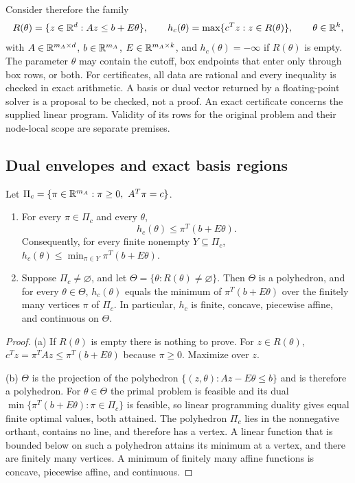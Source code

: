 Consider therefore the family
\begin{equation}\label{eq:param-lp-con}
 R(\theta)=\{z\in\mathbb{R}^d:Az\le b+E\theta\},\qquad
 h_c(\theta)=\max\{c^Tz:z\in R(\theta)\},\qquad \theta\in\mathbb{R}^k,
\end{equation}
with $A\in\mathbb{R}^{m_A\times d}$, $b\in\mathbb{R}^{m_A}$, $E\in\mathbb{R}^{m_A\times k}$, and
$h_c(\theta)=-\infty$ if $R(\theta)$ is empty. The parameter $\theta$ may
contain the cutoff, box endpoints that enter only through box rows, or
both. For certificates, all data are rational and every inequality is
checked in exact arithmetic. A basis or dual vector returned by a
floating-point solver is a proposal to be checked, not a proof. An exact
certificate concerns the supplied linear program. Validity of its rows
for the original problem and their node-local scope are separate premises.

\subsection{Dual envelopes and exact basis regions}\label{sec:dual-regions-con}

\begin{proposition}\label{prop:dual-envelope-con}
Let $\Pi_c=\{\pi\in\R^{m_A}:\pi\ge0,\ A^T\pi=c\}$.
\begin{enumerate}
\item[(a)] For every $\pi\in\Pi_c$ and every $\theta$,
 \begin{equation}\label{eq:dual-envelope-con}
  h_c(\theta)\le\pi^T(b+E\theta).
 \end{equation}
 Consequently, for every finite nonempty $Y\subseteq\Pi_c$,
 $h_c(\theta)\le\min_{\pi\in Y}\pi^T(b+E\theta)$.
\item[(b)] Suppose $\Pi_c\ne\varnothing$, and let
 $\Theta=\{\theta:R(\theta)\ne\varnothing\}$. Then $\Theta$ is a
 polyhedron, and for every $\theta\in\Theta$, $h_c(\theta)$ equals the
 minimum of $\pi^T(b+E\theta)$ over the finitely many vertices $\pi$ of
 $\Pi_c$. In particular, $h_c$ is finite, concave, piecewise affine, and
 continuous on $\Theta$.
\end{enumerate}
\end{proposition}

\begin{proof}
(a) If $R(\theta)$ is empty there is nothing to prove. For
$z\in R(\theta)$, $c^Tz=\pi^TAz\le\pi^T(b+E\theta)$ because $\pi\ge0$.
Maximize over $z$.

(b) $\Theta$ is the projection of the polyhedron
$\{(z,\theta):Az-E\theta\le b\}$ and is therefore a polyhedron. For
$\theta\in\Theta$ the primal problem is feasible and its dual
$\min\{\pi^T(b+E\theta):\pi\in\Pi_c\}$ is feasible, so linear programming
duality gives equal finite optimal values, both attained. The polyhedron
$\Pi_c$ lies in the nonnegative orthant, contains no line, and therefore
has a vertex. A linear function that is bounded below on such a
polyhedron attains its minimum at a vertex, and there are finitely many
vertices. A minimum of finitely many affine functions is concave,
piecewise affine, and continuous.
\end{proof}

